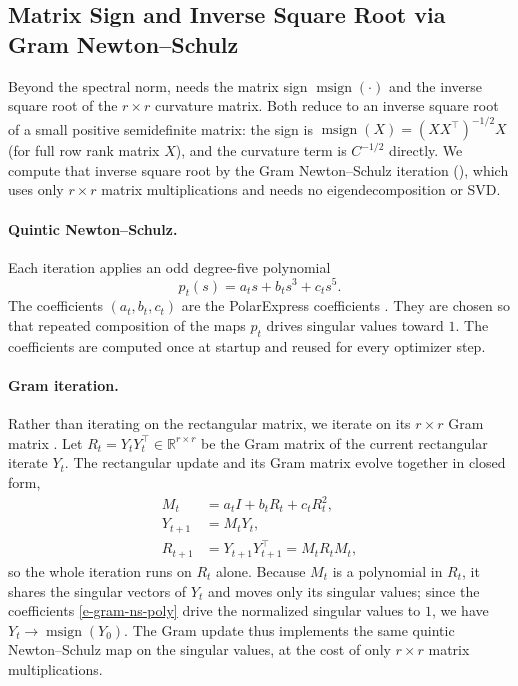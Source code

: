 \documentclass[11pt]{article}
\DeclareMathOperator{\msign}{msign}
\theoremstyle{plain}
\theoremstyle{definition}
\theoremstyle{remark}
\theoremstyle{definition}
\begin{document}
\subsection{Matrix Sign and Inverse Square Root via Gram Newton--Schulz}
\label{app:gramns}

Beyond the spectral norm,  needs the matrix sign $\msign(\cdot)$
and the inverse square root of the $r \times r$ curvature matrix.  Both reduce to
an inverse square root of a small positive semidefinite matrix: the sign is
$\msign(X)=(XX^\top)^{-1/2}X$ (for full row rank matrix $X$), and the curvature term is $C^{-1/2}$ directly.  We
compute that inverse square root by the Gram Newton--Schulz iteration
\cite{gram_ns} (), which uses only $r\times r$ matrix
multiplications and needs no eigendecomposition or SVD.

\paragraph{Quintic Newton--Schulz.}
Each iteration applies an odd degree-five polynomial
\begin{equation}\label{e-gram-ns-poly}
    p_t(s)
    =
    a_t s + b_t s^3 + c_t s^5 .
\end{equation}
The coefficients $(a_t,b_t,c_t)$ are the PolarExpress coefficients
\cite{polarexpress}.  They are chosen so that repeated composition of the
maps $p_t$ drives singular values toward $1$.  The coefficients are
computed once at startup and reused for every optimizer step.


\paragraph{Gram iteration.}
Rather than iterating on the rectangular matrix, we iterate on its $r\times r$
Gram matrix \cite{gram_ns}.  Let $R_t = Y_t Y_t^\top \in \mathbb{R}^{r\times r}$
be the Gram matrix of the current rectangular iterate $Y_t$.  The rectangular
update and its Gram matrix evolve together in closed form,
\[
\begin{aligned}
    M_t &= a_t I + b_t R_t + c_t R_t^2, \\
    Y_{t+1} &= M_t Y_t, \\
    R_{t+1} &= Y_{t+1}Y_{t+1}^\top = M_t R_t M_t ,
\end{aligned}
\]
so the whole iteration runs on $R_t$ alone.  Because $M_t$ is a polynomial in
$R_t$, it shares the singular vectors of $Y_t$ and moves only its singular
values; since the coefficients \eqref{e-gram-ns-poly} drive the normalized
singular values to $1$, we have $Y_t \to \msign(Y_0)$.  The Gram update thus
implements the same quintic Newton--Schulz map on the singular values, at the
cost of only $r\times r$ matrix multiplications.
\end{document}
